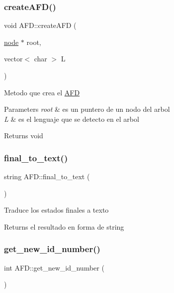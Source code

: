 \subsubsection{\texorpdfstring{create\+A\+F\+D()}{createAFD()}}
{\footnotesize\ttfamily void A\+F\+D\+::create\+A\+FD (\begin{DoxyParamCaption}\item[{\hyperlink{structnode}{node} $\ast$}]{root,  }\item[{vector$<$ char $>$}]{L }\end{DoxyParamCaption})}

Metodo que crea el \hyperlink{class_a_f_d}{A\+FD} 
\begin{DoxyParams}{Parameters}
{\em root} & es un puntero de un nodo del arbol \\
\hline
{\em L} & es el lenguaje que se detecto en el arbol \\
\hline
\end{DoxyParams}
\begin{DoxyReturn}{Returns}
void 
\end{DoxyReturn}
\hypertarget{class_a_f_d_a6882d0942eceb2af40e8a1fe7c057d6e}{}\label{class_a_f_d_a6882d0942eceb2af40e8a1fe7c057d6e} 
\subsubsection{\texorpdfstring{final\+\_\+to\+\_\+text()}{final\_to\_text()}}
{\footnotesize\ttfamily string A\+F\+D\+::final\+\_\+to\+\_\+text (\begin{DoxyParamCaption}{ }\end{DoxyParamCaption})}

Traduce los estados finales a texto \begin{DoxyReturn}{Returns}
el resultado en forma de string 
\end{DoxyReturn}
\hypertarget{class_a_f_d_ae5af7aa0559c41a4857d1b81f66ac3a9}{}\label{class_a_f_d_ae5af7aa0559c41a4857d1b81f66ac3a9} 
\subsubsection{\texorpdfstring{get\+\_\+new\+\_\+id\+\_\+number()}{get\_new\_id\_number()}}
{\footnotesize\ttfamily int A\+F\+D\+::get\+\_\+new\+\_\+id\+\_\+number (\begin{DoxyParamCaption}{ }\end{DoxyParamCaption})}

